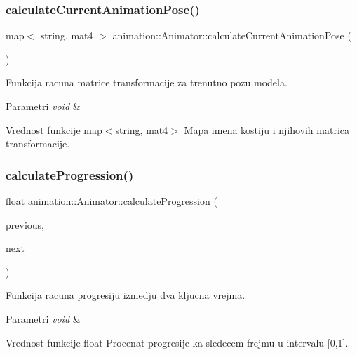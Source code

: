 \subsubsection{\texorpdfstring{calculate\+Current\+Animation\+Pose()}{calculateCurrentAnimationPose()}}
{\footnotesize\ttfamily map$<$ string, mat4 $>$ animation\+::\+Animator\+::calculate\+Current\+Animation\+Pose (\begin{DoxyParamCaption}{ }\end{DoxyParamCaption})\hspace{0.3cm}{\ttfamily [private]}}



Funkcija racuna matrice transformacije za trenutno pozu modela. 


\begin{DoxyParams}{Parametri}
{\em void} & \\
\hline
\end{DoxyParams}
\begin{DoxyReturn}{Vrednost funkcije}
map$<$string, mat4$>$ Mapa imena kostiju i njihovih matrica transformacije. 
\end{DoxyReturn}
\mbox{\label{classanimation_1_1Animator_a050280aa6171aed0f34c481a3b7e0053}} 
\subsubsection{\texorpdfstring{calculate\+Progression()}{calculateProgression()}}
{\footnotesize\ttfamily float animation\+::\+Animator\+::calculate\+Progression (\begin{DoxyParamCaption}\item[{\hyperlink{classanimation_1_1KeyFrame}{Key\+Frame} $\ast$}]{previous,  }\item[{\hyperlink{classanimation_1_1KeyFrame}{Key\+Frame} $\ast$}]{next }\end{DoxyParamCaption})\hspace{0.3cm}{\ttfamily [private]}}



Funkcija racuna progresiju izmedju dva kljucna vrejma. 


\begin{DoxyParams}{Parametri}
{\em void} & \\
\hline
\end{DoxyParams}
\begin{DoxyReturn}{Vrednost funkcije}
float Procenat progresije ka sledecem frejmu u intervalu \mbox{[}0,1\mbox{]}. 
\end{DoxyReturn}
\mbox{\label{classanimation_1_1Animator_a770c61c392ecf21df366a5cf69f4318e}} 
